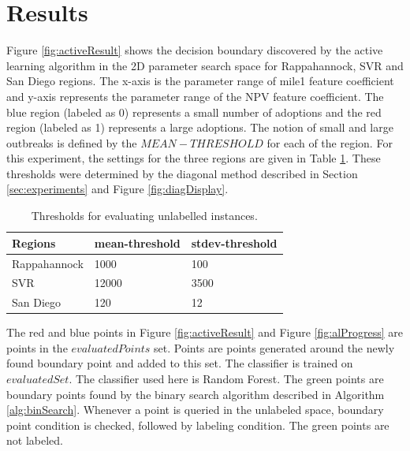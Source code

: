 \section{Results}

Figure \ref{fig:activeResult} shows the decision boundary discovered by the active learning algorithm in the 2D parameter search space for Rappahannock, SVR and San Diego regions. 
The x-axis is the parameter range of mile1 feature coefficient and y-axis represents the parameter range of the NPV feature coefficient.
The blue region (labeled as 0) represents a small number of adoptions and the red region (labeled as 1) represents a large adoptions. The notion of small and large outbreaks is defined by the $MEAN-THRESHOLD$ for each of the region. For this experiment, the settings for the three regions are given in Table \ref{tab: thresholds}. These thresholds were determined by the diagonal method described in Section \ref{sec:experiments} and Figure \ref{fig:diagDisplay}.

\begin{table}[H]
	\centering
	\caption{Thresholds for evaluating unlabelled instances.}
	\begin{tabular}{|l|l|l|}
		\hline
		{\bf Regions} & {\bf mean-threshold} & {\bf stdev-threshold} \\ 
		\hline
		Rappahannock & 1000 & 100 \\ 
		\hline
		SVR & 12000 & 3500 \\ 
		\hline
		San Diego & 120 & 12  \\ 
		\hline
	\end{tabular}
	\label{tab: thresholds}
\end{table}	
	
The red and blue points in Figure \ref{fig:activeResult} and Figure \ref{fig:alProgress} are points in the $evaluatedPoints$ set. Points are points generated around the newly found boundary point and added to this set. The classifier is trained on $evaluatedSet$. The classifier used here is Random Forest. The green points are boundary points found by the binary search algorithm described in Algorithm \ref{alg:binSearch}. Whenever a point is queried in the unlabeled space, boundary point condition is checked, followed by labeling condition. The green points are not labeled.



